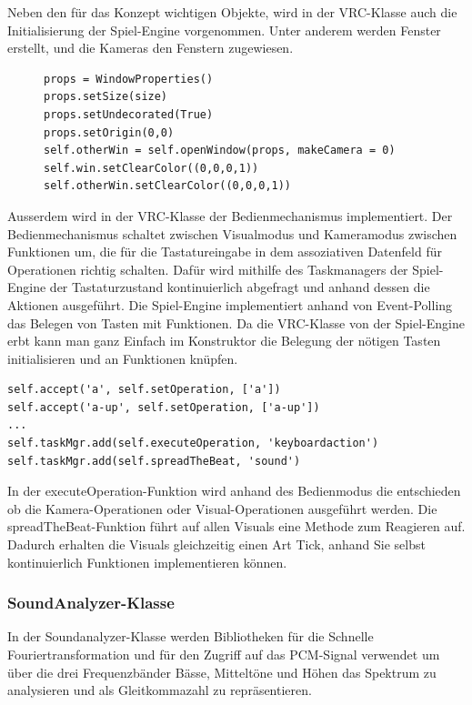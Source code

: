 Neben den f\"ur das Konzept wichtigen Objekte, wird in der VRC-Klasse auch die Initialisierung der Spiel-Engine
vorgenommen. Unter anderem werden Fenster erstellt, und die Kameras den Fenstern zugewiesen.

\begin{figure}
\begin{lstlisting}
props = WindowProperties()
props.setSize(size)
props.setUndecorated(True)
props.setOrigin(0,0)
self.otherWin = self.openWindow(props, makeCamera = 0)
self.win.setClearColor((0,0,0,1))
self.otherWin.setClearColor((0,0,0,1))
\end{lstlisting}
\end{figure}

Ausserdem wird in der VRC-Klasse der Bedienmechanismus implementiert. Der Bedienmechanismus schaltet zwischen
Visualmodus und Kameramodus zwischen Funktionen um, die f\"ur die Tastatureingabe in dem assoziativen Datenfeld
f\"ur Operationen richtig schalten. Daf\"ur wird mithilfe des Taskmanagers der Spiel-Engine der Tastaturzustand
kontinuierlich abgefragt und anhand dessen die Aktionen ausgef\"uhrt.
Die Spiel-Engine implementiert anhand von Event-Polling das Belegen
von Tasten mit Funktionen.
Da die VRC-Klasse von der Spiel-Engine erbt kann man ganz Einfach im Konstruktor die Belegung
der n\"otigen Tasten initialisieren und an Funktionen kn\"upfen.

\begin{lstlisting}
self.accept('a', self.setOperation, ['a'])
self.accept('a-up', self.setOperation, ['a-up'])
...
self.taskMgr.add(self.executeOperation, 'keyboardaction')
self.taskMgr.add(self.spreadTheBeat, 'sound')
\end{lstlisting}

In der executeOperation-Funktion wird anhand des Bedienmodus die entschieden ob die Kamera-Operationen oder
Visual-Operationen ausgef\"uhrt werden. Die spreadTheBeat-Funktion f\"uhrt auf allen Visuals eine Methode zum
Reagieren auf. Dadurch erhalten die Visuals gleichzeitig einen Art Tick, anhand Sie selbst kontinuierlich
Funktionen implementieren k\"onnen.

\subsubsection{SoundAnalyzer-Klasse}

In der Soundanalyzer-Klasse werden Bibliotheken f\"ur die Schnelle Fouriertransformation und f\"ur den Zugriff
auf das PCM-Signal verwendet um \"uber die drei Frequenzb\"ander B\"asse, Mittelt\"one und H\"ohen das Spektrum
zu analysieren und als Gleitkommazahl zu repr\"asentieren.



